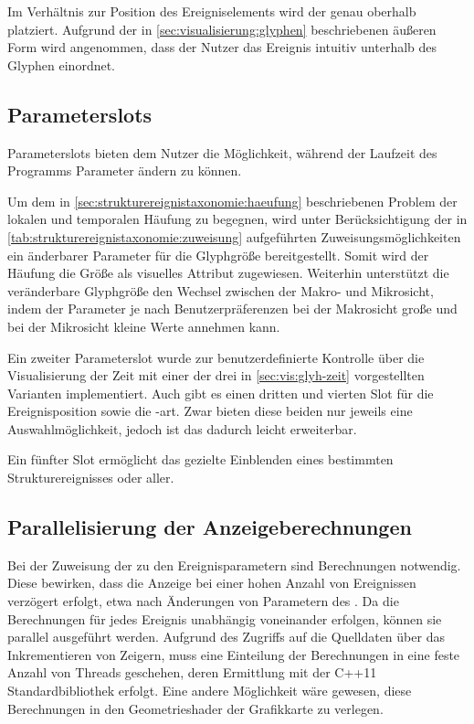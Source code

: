 Im Verhältnis zur Position des Ereigniselements wird der  genau oberhalb platziert. Aufgrund der in \autoref{sec:visualisierung:glyphen} beschriebenen äußeren Form wird angenommen, dass der Nutzer das Ereignis intuitiv unterhalb des Glyphen einordnet.


\subsection*{Parameterslots} 
Parameterslots bieten dem Nutzer die Möglichkeit, während der Laufzeit des Programms Parameter ändern zu können.

Um dem in \autoref{sec:strukturereignistaxonomie:haeufung} beschriebenen Problem der lokalen und temporalen Häufung zu begegnen, wird unter Berücksichtigung der in \autoref{tab:strukturereignistaxonomie:zuweisung} aufgeführten Zuweisungsmöglichkeiten ein änderbarer Parameter für die Glyphgröße bereitgestellt. Somit wird der Häufung die Größe als visuelles Attribut zugewiesen. Weiterhin unterstützt die veränderbare Glyphgröße den Wechsel zwischen der Makro- und Mikrosicht, indem der Parameter je nach Benutzerpräferenzen bei der Makrosicht große und bei der Mikrosicht kleine Werte annehmen kann.

Ein zweiter Parameterslot wurde zur benutzerdefinierte Kontrolle über die Visualisierung der Zeit mit einer der drei in \autoref{sec:vis:glyh-zeit} vorgestellten Varianten implementiert. Auch gibt es einen dritten und vierten Slot für die Ereignisposition sowie die -art. Zwar bieten diese beiden nur jeweils eine Auswahlmöglichkeit, jedoch ist das  dadurch leicht erweiterbar.

Ein fünfter Slot ermöglicht das gezielte Einblenden eines bestimmten Strukturereignisses oder aller.


\subsection*{Parallelisierung der Anzeigeberechnungen}
Bei der Zuweisung der  zu den Ereignisparametern sind Berechnungen notwendig. Diese bewirken, dass die Anzeige bei einer hohen Anzahl von Ereignissen verzögert erfolgt, etwa nach Änderungen von Parametern des . Da die Berechnungen für jedes Ereignis unabhängig voneinander erfolgen, können sie parallel ausgeführt werden. Aufgrund des Zugriffs auf die Quelldaten über das Inkrementieren von Zeigern, muss eine Einteilung der Berechnungen in eine feste Anzahl von Threads geschehen, deren Ermittlung mit der C++11 Standardbibliothek  erfolgt. Eine andere Möglichkeit wäre gewesen, diese Berechnungen in den Geometrieshader der Grafikkarte zu verlegen.

